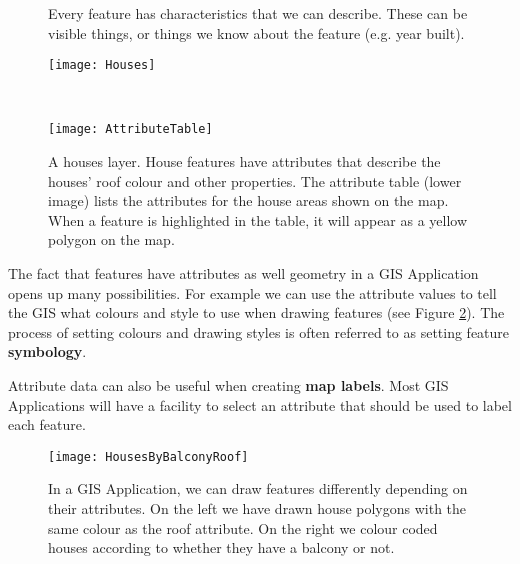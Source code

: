 \begin{figure}[htpb]
   \begin{minipage}[h]{\textwidth}
   \begin{center}
   \caption{Every feature has characteristics that we can describe. These can
be visible things, or things we know about the feature (e.g. year built).}
   \label{fig:houses}\smallskip
   \texttt{[image: Houses]}
   \end{center}
   \end{minipage} \\
   \vspace{1cm}
   \begin{minipage}[h]{\textwidth}
   \begin{center}
   \caption{A houses layer. House features have attributes that describe the
houses' roof colour and other properties. The attribute table (lower image)
lists the attributes for the house areas shown on the map. When a feature is
highlighted  in the table, it will appear as a yellow polygon on the map.}
   \label{fig:attrtable}\smallskip
   \texttt{[image: AttributeTable]}
   \end{center}
   \end{minipage}
\end{figure}

The fact that features have attributes as well geometry in a GIS Application
opens up many possibilities. For example we can use the attribute values to
tell the GIS what colours and style to use when drawing features (see Figure
\ref{fig:houseroofbalc}). The process of setting colours and drawing styles is
often referred to as setting feature \textbf{symbology}. 

Attribute data can also be useful when creating \textbf{map labels}. Most GIS
Applications will have a facility to select an attribute that should be used
to label each feature. 

\begin{figure}[ht]
   \begin{center}
   \caption{In a GIS Application, we can draw features differently depending
on their attributes. On the left we have drawn house polygons with the same
colour as the roof attribute. On the right we colour coded houses according
to whether they have a balcony or not.}
\label{fig:houseroofbalc}\smallskip
   \texttt{[image: HousesByBalconyRoof]}
\end{center}
\end{figure}


